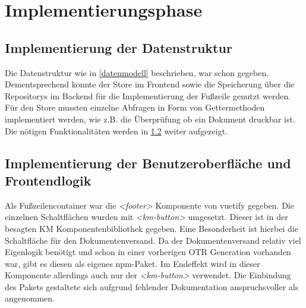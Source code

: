 \section{Implementierungsphase}
\label{implementierungsphase}

\subsection{Implementierung der Datenstruktur}
\label{datenstruktur}
Die Datenstruktur wie in \ref{datenmodell}  beschrieben, war schon gegeben. Dementsprechend konnte der Store im Frontend sowie die Speicherung über die Repositorys im Backend für die Implementierung der Fußzeile genutzt werden.\\
Für den Store mussten einzelne Abfragen in Form von Gettermethoden implementiert werden, wie z.B. die Überprüfung ob ein Dokument druckbar ist. Die nötigen Funktionalitäten werden in \ref{oberflacheimplemetieren}  weiter aufgezeigt.
\subsection{Implementierung der Benutzeroberfläche und Frontendlogik}
\label{oberflacheimplemetieren}
Als Fußzeilencontainer war die \textit{<footer>} Komponente von \gls{vuetify} gegeben. Die einzelnen Schaltflächen wurden mit \textit{<km-button>} umgesetzt. Dieser ist in der besagten \ac{KM} Komponentenbibliothek gegeben. Eine Besonderheit ist hierbei die Schaltfläche für den Dokumentenversand. Da der Dokumentenversand relativ viel Eigenlogik benötigt und schon in einer vorherigen \ac{OTR} Generation vorhanden war, gibt es diesen als eigenes \gls{npm}-Paket. Im Endeffekt wird in dieser Komponente allerdings auch nur der \textit{<km-button>} verwendet. Die Einbindung des Pakets gestaltete sich aufgrund fehlender Dokumentation anspruchsvoller als angenommen.\\

